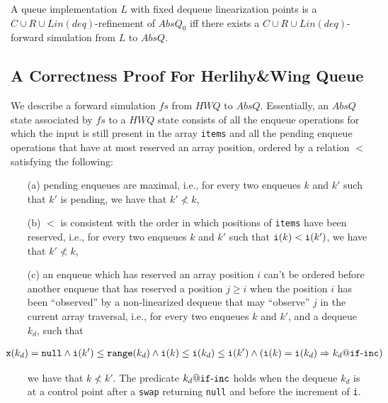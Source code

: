 \begin{corollary}
A queue implementation $L$ with fixed dequeue linearization points is a $C\cup R\cup Lin(deq)$-refinement of $AbsQ_0$ if{f} there exists a $C\cup R\cup Lin(deq)$-forward simulation from $L$ to $AbsQ$.
\end{corollary}

\subsection{A Correctness Proof For Herlihy\&Wing Queue}\label{ssec:HerlihyWing}

We describe a forward simulation $\mathit{fs}$ from $\mathit{HWQ}$ to $AbsQ$. Essentially, an $AbsQ$ state associated by $\mathit{fs}$ to a $\mathit{HWQ}$ state consists of all the  enqueue operations for which the input is still present in the array {\tt items} and all the pending enqueue operations that have at most reserved an array position, ordered by a relation $<$ satisfying the following: 
\begin{itemize}
	\item[(a)] pending enqueues are maximal, i.e., for every two enqueues $k$ and $k'$ such that $k'$ is pending, we have that $k'\not< k$,
	\item[(b)] $<$ is consistent with the order in which positions of {\tt items} have been reserved, i.e., for every two enqueues $k$ and $k'$ such that ${\tt i}(k) < {\tt i}(k')$, we have that $k' \not< k$,
	\item[(c)] an enqueue which has reserved an array position $i$ %
	can't be ordered before another enqueue that has reserved a position $j \geq i$ when the position $i$ has been ``observed'' by a non-linearized dequeue that may ``observe'' $j$ in the current array traversal, i.e., for every two enqueues $k$ and $k'$, and a dequeue $k_d$, such that 
	
	\noindent
	{\small
	\begin{align}
	\hspace{-8mm}
	{\tt x}(k_d)={\tt null} \land {\tt i}(k') \leq {\tt range}(k_d) \land {\tt i}(k) \leq {\tt i}(k_d) \leq {\tt i}(k')
	 \land ({\tt i}(k) = {\tt i}(k_d) => k_d\atCP {\tt if}\text{-}{\tt inc}) \label{eq:inst}
	\end{align}}
	
	\noindent
	we have that $k \not< k'$. The predicate $k_d\atCP {\tt if}\text{-}{\tt inc}$ holds when the dequeue $k_d$ is at a control point after a {\tt swap} returning {\tt null} and before the increment of {\tt i}.
\end{itemize}

